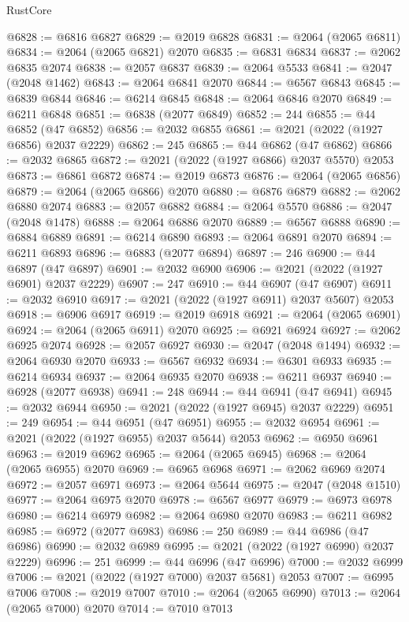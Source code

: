 \begin{lexlean}{RustCore}
\begin{coremodule}
@6828 := @6816 @6827
@6829 := @2019 @6828
@6831 := @2064 (@2065 @6811)
@6834 := @2064 (@2065 @6821) @2070
@6835 := @6831 @6834
@6837 := @2062 @6835 @2074
@6838 := @2057 @6837
@6839 := @2064 @5533
@6841 := @2047 (@2048 @1462)
@6843 := @2064 @6841 @2070
@6844 := @6567 @6843
@6845 := @6839 @6844
@6846 := @6214 @6845
@6848 := @2064 @6846 @2070
@6849 := @6211 @6848
@6851 := @6838 (@2077 @6849)
@6852 := 244
@6855 := @44 @6852 (@47 @6852)
@6856 := @2032 @6855
@6861 := @2021 (@2022 (@1927 @6856) @2037 @2229)
@6862 := 245
@6865 := @44 @6862 (@47 @6862)
@6866 := @2032 @6865
@6872 := @2021 (@2022 (@1927 @6866) @2037 @5570) @2053
@6873 := @6861 @6872
@6874 := @2019 @6873
@6876 := @2064 (@2065 @6856)
@6879 := @2064 (@2065 @6866) @2070
@6880 := @6876 @6879
@6882 := @2062 @6880 @2074
@6883 := @2057 @6882
@6884 := @2064 @5570
@6886 := @2047 (@2048 @1478)
@6888 := @2064 @6886 @2070
@6889 := @6567 @6888
@6890 := @6884 @6889
@6891 := @6214 @6890
@6893 := @2064 @6891 @2070
@6894 := @6211 @6893
@6896 := @6883 (@2077 @6894)
@6897 := 246
@6900 := @44 @6897 (@47 @6897)
@6901 := @2032 @6900
@6906 := @2021 (@2022 (@1927 @6901) @2037 @2229)
@6907 := 247
@6910 := @44 @6907 (@47 @6907)
@6911 := @2032 @6910
@6917 := @2021 (@2022 (@1927 @6911) @2037 @5607) @2053
@6918 := @6906 @6917
@6919 := @2019 @6918
@6921 := @2064 (@2065 @6901)
@6924 := @2064 (@2065 @6911) @2070
@6925 := @6921 @6924
@6927 := @2062 @6925 @2074
@6928 := @2057 @6927
@6930 := @2047 (@2048 @1494)
@6932 := @2064 @6930 @2070
@6933 := @6567 @6932
@6934 := @6301 @6933
@6935 := @6214 @6934
@6937 := @2064 @6935 @2070
@6938 := @6211 @6937
@6940 := @6928 (@2077 @6938)
@6941 := 248
@6944 := @44 @6941 (@47 @6941)
@6945 := @2032 @6944
@6950 := @2021 (@2022 (@1927 @6945) @2037 @2229)
@6951 := 249
@6954 := @44 @6951 (@47 @6951)
@6955 := @2032 @6954
@6961 := @2021 (@2022 (@1927 @6955) @2037 @5644) @2053
@6962 := @6950 @6961
@6963 := @2019 @6962
@6965 := @2064 (@2065 @6945)
@6968 := @2064 (@2065 @6955) @2070
@6969 := @6965 @6968
@6971 := @2062 @6969 @2074
@6972 := @2057 @6971
@6973 := @2064 @5644
@6975 := @2047 (@2048 @1510)
@6977 := @2064 @6975 @2070
@6978 := @6567 @6977
@6979 := @6973 @6978
@6980 := @6214 @6979
@6982 := @2064 @6980 @2070
@6983 := @6211 @6982
@6985 := @6972 (@2077 @6983)
@6986 := 250
@6989 := @44 @6986 (@47 @6986)
@6990 := @2032 @6989
@6995 := @2021 (@2022 (@1927 @6990) @2037 @2229)
@6996 := 251
@6999 := @44 @6996 (@47 @6996)
@7000 := @2032 @6999
@7006 := @2021 (@2022 (@1927 @7000) @2037 @5681) @2053
@7007 := @6995 @7006
@7008 := @2019 @7007
@7010 := @2064 (@2065 @6990)
@7013 := @2064 (@2065 @7000) @2070
@7014 := @7010 @7013

\end{coremodule}
\end{lexlean}
